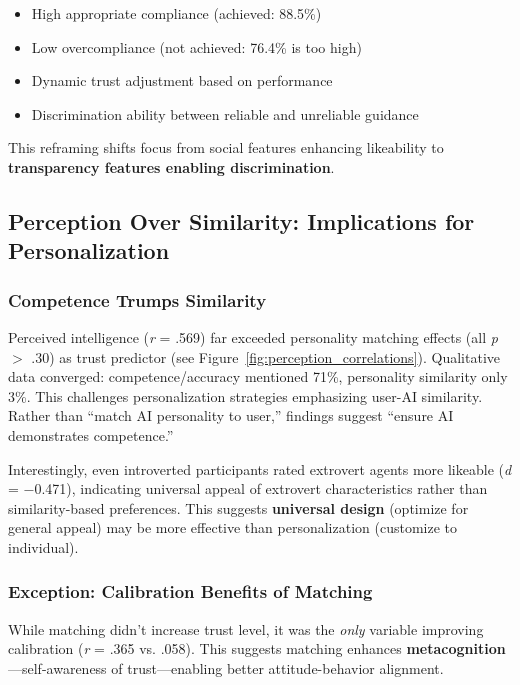 \documentclass[12pt]{article}
\begin{document}
\begin{itemize}
    \item High appropriate compliance (achieved: 88.5\%)
    \item Low overcompliance (not achieved: 76.4\% is too high)
    \item Dynamic trust adjustment based on performance
    \item Discrimination ability between reliable and unreliable guidance
\end{itemize}

This reframing shifts focus from social features enhancing likeability to \textbf{transparency features enabling discrimination}.

\subsection{Perception Over Similarity: Implications for Personalization}

\subsubsection{Competence Trumps Similarity}

Perceived intelligence (\textit{r} = .569) far exceeded personality matching effects (all \textit{p} $>$ .30) as trust predictor (see Figure~\ref{fig:perception_correlations}). Qualitative data converged: competence/accuracy mentioned 71\%, personality similarity only 3\%. This challenges personalization strategies emphasizing user-AI similarity. Rather than ``match AI personality to user,'' findings suggest ``ensure AI demonstrates competence.''

Interestingly, even introverted participants rated extrovert agents more likeable (\textit{d} = $-$0.471), indicating universal appeal of extrovert characteristics rather than similarity-based preferences. This suggests \textbf{universal design} (optimize for general appeal) may be more effective than personalization (customize to individual).

\subsubsection{Exception: Calibration Benefits of Matching}

While matching didn't increase trust level, it was the \textit{only} variable improving calibration (\textit{r} = .365 vs. .058). This suggests matching enhances \textbf{metacognition}---self-awareness of trust---enabling better attitude-behavior alignment.
\end{document}
